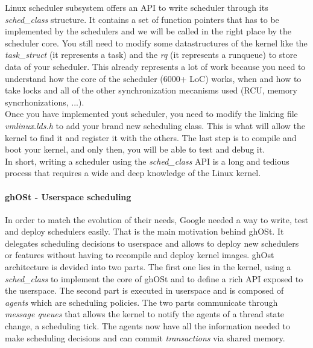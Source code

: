 \par Linux scheduler subsystem offers an API to write scheduler through its \textit{sched\_class} structure. It contains a set of function pointers that has to be implemented by the schedulers and we will be called in the right place by the scheduler core. You still need to modify some datastructures of the kernel like the \textit{task\_struct} (it represents a task) and the \textit{rq} (it represents a runqueue) to store data of your scheduler. This already represents a lot of work because you need to understand how the core of the scheduler (6000+ LoC) works, when and how to take locks and all of the other synchronization mecanisms used (RCU, memory syncrhonizations, ...). \\ Once you have implemented yout scheduler, you need to modify the linking file \textit{vmlinux.lds.h} to add your brand new scheduling class. This is what will allow the kernel to find it and register it with the others. The last step is to compile and boot your kernel, and only then, you will be able to test and debug it. \\ 
In short, writing a scheduler using the \textit{sched\_class} API is a long and tedious process that requires a wide and deep knowledge of the Linux kernel. 

\paragraph{ghOSt - Userspace scheduling}

\par In order to match the evolution of their needs, Google needed a way to write, test and deploy schedulers easily. That is the main motivation behind ghOSt\cite{ghost-paper}. It delegates scheduling decisions to userspace and allows to deploy new schedulers or features without having to recompile and deploy kernel images. ghOst architecture is devided into two parts. The first one lies in the kernel, using a \textit{sched\_class} to implement the core of ghOSt and to define a rich API exposed to the userspace. The second part is executed in userspace and is composed of \textit{agents} which are scheduling policies. The two parts communicate through \textit{message queues} that allows the kernel to notify the agents of a thread state change, a scheduling tick. The agents now have all the information needed to make scheduling decisions and can commit \textit{transactions} via shared memory. 

